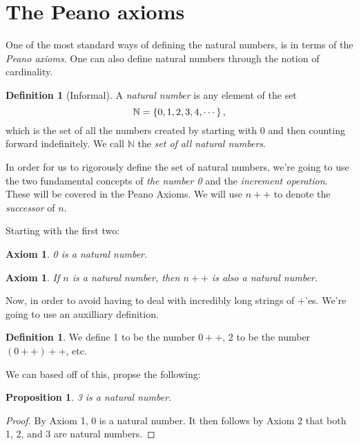 \documentclass[a4paper, twocolumn]{report}
\newcounter{dummy} \numberwithin{dummy}{section}
\newcounter{axmcntr} \numberwithin{axmcntr}{chapter}
\newtheorem{axm}[axmcntr]{Axiom}
\newtheorem{prp}[dummy]{Proposition}
\theoremstyle{definition}
\newtheorem{defn}[dummy]{Definition}
\theoremstyle{solution}
\newcommand{\dplus}{{+}{+}} %
\begin{document}
\section{The Peano axioms}
One of the most standard ways of defining the natural numbers, is in terms of
the \textit{Peano axioms}. One can also define natural numbers through the
notion of cardinality.

\begin{defn}[Informal]
  \label{defn_211}
  A \textit{natural number} is any element of the set
  \begin{equation}
    \notag
    \mathbb{N} = \left\{ 0, 1, 2, 3, 4, \cdots \right\},
  \end{equation}
  which is the set of all the numbers created by starting with 0 and then
  counting forward indefinitely. We call $\mathbb{N}$ the \textit{set of all
  natural numbers}.
\end{defn}

In order for us to rigorously define the set of natural numbers, we're going to
use the two fundamental concepts of \textit{the number 0} and the
\textit{increment operation}.  These will be covered in the Peano Axioms.
We will use $n\dplus$ to denote the \textit{successor} of $n$. 

Starting with the first two: 
\begin{axm}
  \label{axm_21}
  0 is a natural number.
\end{axm}
\begin{axm}
  \label{axm_22}
  If $n$ is a natural number, then $n\dplus$ is also a natural number.
\end{axm}

Now, in order to avoid having to deal with incredibly long strings of $+$'es.
We're going to use an auxilliary definition.
\addtocounter{dummy}{1}
\begin{defn}
  \label{defn_213}
  We define 1 to be the number $0\dplus$, 2 to be the number $(0\dplus)\dplus$, etc.
\end{defn}
We can based off of this, propse the following:

\begin{prp}
  \label{prp_214}
  3 is a natural number.
\end{prp}
\begin{proof}
  By Axiom 1, 0 is a natural number.
  It then follows by Axiom 2 that both 1, 2, and 3 are natural numbers.
\end{proof}
\end{document}
